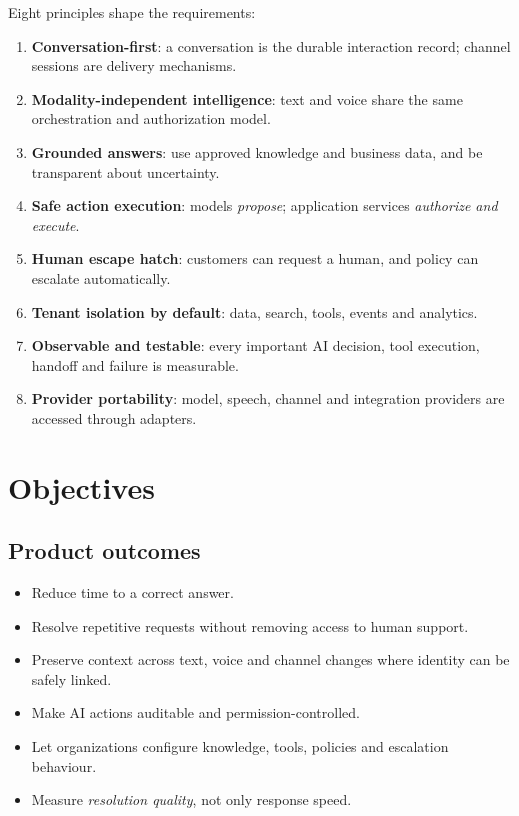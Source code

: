 Eight principles shape the requirements:
\begin{enumerate}
  \item \textbf{Conversation-first}: a conversation is the durable interaction record; channel sessions are delivery mechanisms.
  \item \textbf{Modality-independent intelligence}: text and voice share the same orchestration and authorization model.
  \item \textbf{Grounded answers}: use approved knowledge and business data, and be transparent about uncertainty.
  \item \textbf{Safe action execution}: models \emph{propose}; application services \emph{authorize and execute}.
  \item \textbf{Human escape hatch}: customers can request a human, and policy can escalate automatically.
  \item \textbf{Tenant isolation by default}: data, search, tools, events and analytics.
  \item \textbf{Observable and testable}: every important AI decision, tool execution, handoff and failure is measurable.
  \item \textbf{Provider portability}: model, speech, channel and integration providers are accessed through adapters.
\end{enumerate}

\section{Objectives}
\subsection{Product outcomes}
\begin{itemize}
  \item Reduce time to a correct answer.
  \item Resolve repetitive requests without removing access to human support.
  \item Preserve context across text, voice and channel changes where identity can be safely linked.
  \item Make AI actions auditable and permission-controlled.
  \item Let organizations configure knowledge, tools, policies and escalation behaviour.
  \item Measure \emph{resolution quality}, not only response speed.
\end{itemize}

